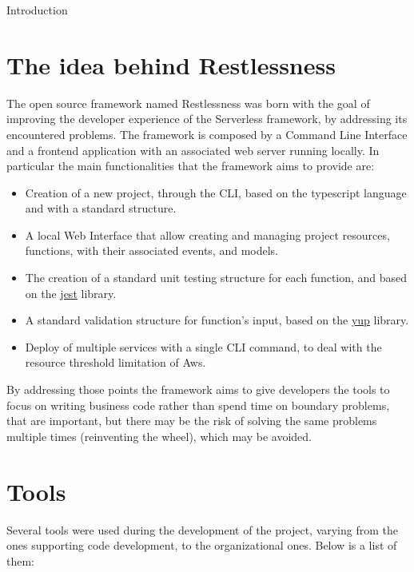 \begin{chapter}{Introduction}
    \section{The idea behind Restlessness}
    The open source framework named Restlessness was born with the goal of improving
    the developer experience of the Serverless framework, by addressing its encountered
    problems.
    The framework is composed by a Command Line Interface and a frontend application
    with an associated web server running locally.
    In particular the main functionalities that the framework aims to provide are:
    \begin{itemize}
        \item Creation of a new project, through the CLI, based on the typescript
            language and with a standard structure.
        \item A local Web Interface that allow creating and managing project resources,
            functions, with their associated events, and models.
        \item The creation of a standard unit testing structure for each function,
            and based on the \href{https://www.npmjs.com/package/jest}{jest} library.
        \item A standard validation structure for function's input, based on the
            \href{https://www.npmjs.com/package/yup}{yup} library.
        \item Deploy of multiple services with a single CLI command, to deal with
            the resource threshold limitation of Aws.
    \end{itemize}

    By addressing those points the framework aims to give developers the tools to
    focus on writing business code rather than spend time on boundary problems,
    that are important, but there may be the risk of solving the same problems
    multiple times (reinventing the wheel), which may be avoided.


    \section{Tools}
    Several tools were used during the development of the project, varying from the ones supporting
    code development, to the organizational ones. Below is a list of them:


\end{chapter}
